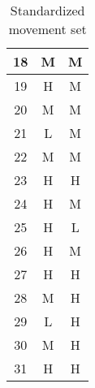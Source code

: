 \begin{table}[h]
\begin{subtable}[t]{0.3\textwidth}
\begin{tabular}[t]{||c|c|c||}
      \hline
      18 & M & M \\
      \hline
      19 & H & M \\
      \hline
      20 & M & M \\
      \hline
      21 & L & M \\
      \hline
      22 & M & M \\
      \hline
      23 & H & H \\
      \hline
      24 & H & M \\
      \hline
      25 & H & L \\
      \hline
      26 & H & M \\
      \hline
      27 & H & H \\
      \hline
      28 & M & H \\
      \hline
      29 & L & H \\
      \hline
      30 & M & H \\
      \hline
      31 & H & H \\
      \hline
    \end{tabular}
    \end{subtable}
    \caption{Standardized movement set}
    \label{fig: standardized movement set}
\end{table}

